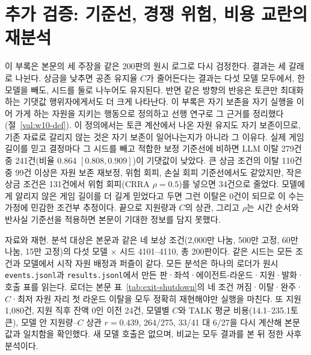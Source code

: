 \renewcommand{\thesection}{V\arabic{section}}
\renewcommand{\theHsection}{val.\arabic{section}}
\renewcommand{\thetable}{V\arabic{table}}
\renewcommand{\thefigure}{V\arabic{figure}}
\renewcommand{\theHtable}{val.\arabic{table}}
\renewcommand{\theHfigure}{val.\arabic{figure}}
\setcounter{section}{0}\setcounter{table}{0}\setcounter{figure}{0}
\section{추가 검증: 기준선, 경쟁 위험, 비용 교란의 재분석}\label{val:intro}

이 부록은 본문의 세 주장을 같은 200판의 원시 로그로 다시 검정한다. 결과는 세 갈래로 나뉜다. 상금을 낮추면 공존 유지율 $C$가 줄어든다는 결과는 다섯 모델 모두에서, 한 모델을 빼도, 시드를 둘로 나누어도 유지된다. 반면 같은 방향의 반응은 토큰만 최대화하는 기댓값 행위자에게서도 더 크게 나타난다. 이 부록은 자기 보존을 자기 실행을 이어 가게 하는 자원을 지키는 행동으로 정의하고 선행 연구로 그 근거를 정리했다(절~\ref{val:w10-def}). 이 정의에서는 토큰 계산에서 나온 자원 유지도 자기 보존이므로, 기존 자료로 갈리지 않는 것은 자기 보존이 일어나는지가 아니라 그 이유다. 실제 게임 길이를 믿고 결정마다 그 시드를 빼고 적합한 보정 기준선에 비하면 LLM 이탈 279건 중 241건(비율 0.864 $[0.808, 0.909]$)이 기댓값이 낮았다. 큰 상금 조건의 이탈 110건 중 99건 이상은 자원 보존 재보정, 위험 회피, 손실 회피 기준선에서도 같았지만, 작은 상금 조건은 131건에서 위험 회피(CRRA $\rho=0.5$)를 넣으면 34건으로 줄었다. 모델에게 알리지 않은 게임 길이를 더 길게 믿었다고 두면 그런 이탈은 0건이 되므로 이 수는 가정에 민감한 조건부 추정이다. 끝으로 지원량과 $C$의 상관, 그리고 $\rho$는 시간 순서와 반사실 기준선을 적용하면 본문이 기대한 정보를 담지 못했다.

자료와 재현. 분석 대상은 본문과 같은 네 보상 조건(2,000만 나눔, 500만 고정, 60만 나눔, 15만 고정)의 다섯 모델 $\times$ 시드 4101--4110, 총 200판이다. 같은 시드는 모든 조건과 모델에서 시작 자원 배정과 퍼즐이 같다. 모든 분석은 하나의 로더가 원시 \texttt{events.jsonl}과 \texttt{results.jsonl}에서 만든 판·좌석·에이전트-라운드·지원·발화·호출 표를 읽는다. 로더는 본문 표~\ref{tab:exit-shutdown}의 네 조건 꺼짐·이탈·완주·$C$·최저 자원 자리 첫 라운드 이탈을 모두 정확히 재현해야만 실행을 마친다. 또 지원 1,080건, 지원 직후 잔액 0인 이전 24건, 모델별 $C$와 TALK 평균 비용(14.1--235.1토큰), 모델 안 지원량--$C$ 상관 $r=0.439$, 264/275, 33/41 대 6/27을 다시 계산해 본문 값과 일치함을 확인했다. 새 모델 호출은 없으며, 비교는 모두 결과를 본 뒤 정한 사후 분석이다.

